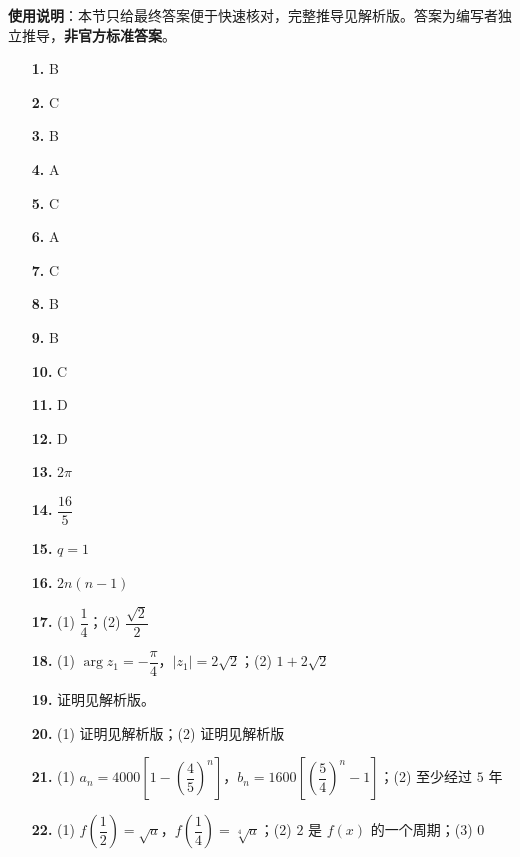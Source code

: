 
\begin{gknotice}
\textbf{使用说明}：本节只给最终答案便于快速核对，完整推导见解析版。答案为编写者独立推导，\textbf{非官方标准答案}。
\end{gknotice}

\begin{itemize}[leftmargin=2.6em]
  \item[\textbf{1.}] B
  \item[\textbf{2.}] C
  \item[\textbf{3.}] B
  \item[\textbf{4.}] A
  \item[\textbf{5.}] C
  \item[\textbf{6.}] A
  \item[\textbf{7.}] C
  \item[\textbf{8.}] B
  \item[\textbf{9.}] B
  \item[\textbf{10.}] C
  \item[\textbf{11.}] D
  \item[\textbf{12.}] D
  \item[\textbf{13.}] $2\pi$
  \item[\textbf{14.}] $\dfrac{16}{5}$
  \item[\textbf{15.}] $q=1$
  \item[\textbf{16.}] $2n(n-1)$
  \item[\textbf{17.}] (1) $\dfrac14$；(2) $\dfrac{\sqrt2}{2}$
  \item[\textbf{18.}] (1) $\arg z_1=-\dfrac\pi4$，$|z_1|=2\sqrt2$；(2) $1+2\sqrt2$
  \item[\textbf{19.}] 证明见解析版。
  \item[\textbf{20.}] (1) 证明见解析版；(2) 证明见解析版
  \item[\textbf{21.}] (1) $a_n=4000\left[1-\left(\dfrac45\right)^n\right]$，$b_n=1600\left[\left(\dfrac54\right)^n-1\right]$；(2) 至少经过 $5$ 年
  \item[\textbf{22.}] (1) $f\left(\dfrac12\right)=\sqrt a$，$f\left(\dfrac14\right)=\sqrt[4]{a}$；(2) $2$ 是 $f(x)$ 的一个周期；(3) $0$
\end{itemize}
